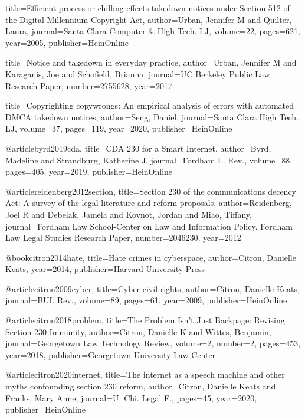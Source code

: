 
{
  title={Efficient process or chilling effects-takedown notices under Section 512 of the Digital Millennium Copyright Act},
  author={Urban, Jennifer M and Quilter, Laura},
  journal={Santa Clara Computer \& High Tech. LJ},
  volume={22},
  pages={621},
  year={2005},
  publisher={HeinOnline}
}


{
  title={Notice and takedown in everyday practice},
  author={Urban, Jennifer M and Karaganis, Joe and Schofield, Brianna},
  journal={UC Berkeley Public Law Research Paper},
  number={2755628},
  year={2017}
}

{
  title={Copyrighting copywrongs: An empirical analysis of errors with automated DMCA takedown notices},
  author={Seng, Daniel},
  journal={Santa Clara High Tech. LJ},
  volume={37},
  pages={119},
  year={2020},
  publisher={HeinOnline}
}

@article{byrd2019cda,
  title={CDA 230 for a Smart Internet},
  author={Byrd, Madeline and Strandburg, Katherine J},
  journal={Fordham L. Rev.},
  volume={88},
  pages={405},
  year={2019},
  publisher={HeinOnline}
}

@article{reidenberg2012section,
  title={Section 230 of the communications decency Act: A survey of the legal literature and reform proposals},
  author={Reidenberg, Joel R and Debelak, Jamela and Kovnot, Jordan and Miao, Tiffany},
  journal={Fordham Law School-Center on Law and Information Policy, Fordham Law Legal Studies Research Paper},
  number={2046230},
  year={2012}
}

@book{citron2014hate,
  title={Hate crimes in cyberspace},
  author={Citron, Danielle Keats},
  year={2014},
  publisher={Harvard University Press}
}

@article{citron2009cyber,
  title={Cyber civil rights},
  author={Citron, Danielle Keats},
  journal={BUL Rev.},
  volume={89},
  pages={61},
  year={2009},
  publisher={HeinOnline}
}

@article{citron2018problem,
  title={The Problem Isn't Just Backpage: Revising Section 230 Immunity},
  author={Citron, Danielle K and Wittes, Benjamin},
  journal={Georgetown Law Technology Review},
  volume={2},
  number={2},
  pages={453},
  year={2018},
  publisher={Georgetown University Law Center}
}

@article{citron2020internet,
  title={The internet as a speech machine and other myths confounding section 230 reform},
  author={Citron, Danielle Keats and Franks, Mary Anne},
  journal={U. Chi. Legal F.},
  pages={45},
  year={2020},
  publisher={HeinOnline}
}

